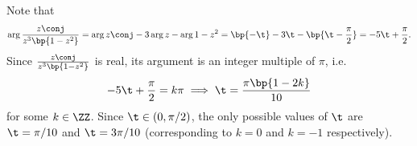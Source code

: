\begin{solution}
\begin{ppart}
\begin{center}
        \end{center}
    \end{ppart}
    \begin{ppart}
        Note that \[\arg{\frac{z\conj}{z^3 \bp{1 - z^2}}} = \arg{z\conj} - 3\arg{z} - \arg{1 - z^2} = \bp{-\t} - 3\t - \bp{\t - \frac\pi2} = -5\t + \frac\pi2.\] Since $\frac{z\conj}{z^3 \bp{1 - z^2}}$ is real, its argument is an integer multiple of $\pi$, i.e. \[-5\t + \frac\pi2 = k \pi \implies \t = \frac{\pi\bp{1 - 2k}}{10}\] for some $k \in \ZZ$. Since $\t \in (0, \pi/2)$, the only possible values of $\t$ are $\t = \pi/10$ and $\t = 3\pi/10$ (corresponding to $k = 0$ and $k = -1$ respectively).
    \end{ppart}
\end{solution}